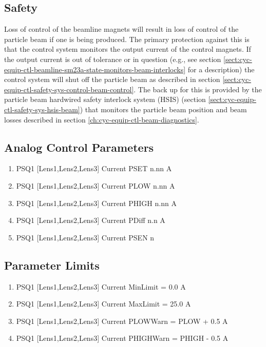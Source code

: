 \documentclass[11pt]{book}		%
\begin{document}
\subsection{Safety}\label{sect:cyc-op-interface-status-beamline-tofc1-safety}

Loss of control of the beamline magnets will result in loss of control of the particle beam if one is being produced.  The primary protection against this is that the control system monitors the output current of the control magnets.  If the output current is out of tolerance or in question (e.g., see section \ref{sect:cyc-equip-ctl-beamline-sm23a-state-monitors-beam-interlocks} for a description) the control system will shut off the particle beam as described in section \ref{sect:cyc-equip-ctl-safety-sys-control-beam-control}.  The back up for this is provided by the particle beam hardwired safety interlock system (HSIS) (section \ref{sect:cyc-equip-ctl-safety-sys-hsis-beam}) that monitors the particle beam position and beam losses described in section \ref{ch:cyc-equip-ctl-beam-diagnostics}.

\subsection{Analog Control Parameters}\label{sect:cyc-op-interface-status-beamline-tofc1-analog-control}


\begin{enumerate}
 \item PSQ1 [Lens1,Lens2,Lens3] Current PSET  n.nn A
 \item PSQ1 [Lens1,Lens2,Lens3] Current PLOW  n.nn A
 \item PSQ1 [Lens1,Lens2,Lens3] Current PHIGH n.nn A
 \item PSQ1 [Lens1,Lens2,Lens3] Current PDiff n.n A
 \item PSQ1 [Lens1,Lens2,Lens3] Current PSEN  n
\end{enumerate}

\subsection{Parameter Limits} \label{sect:cyc-op-interface-status-beamline-tofc1-analog-control-limits}

\begin{enumerate}
 \item PSQ1 [Lens1,Lens2,Lens3] Current MinLimit = 0.0 A
 \item PSQ1 [Lens1,Lens2,Lens3] Current MaxLimit = 25.0 A
 \item PSQ1 [Lens1,Lens2,Lens3] Current PLOWWarn = PLOW + 0.5 A
 \item PSQ1 [Lens1,Lens2,Lens3] Current PHIGHWarn = PHIGH - 0.5 A
\end{enumerate}
\end{document}
